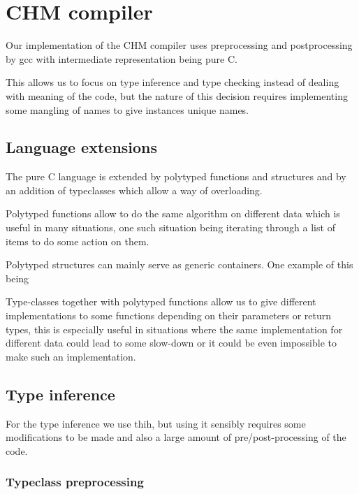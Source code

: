 \chapter{CHM compiler}

Our implementation of the CHM compiler uses preprocessing and postprocessing by gcc
with intermediate representation being pure C.

This allows us to focus on type inference and type checking instead of dealing with
meaning of the code, but the nature of this decision requires implementing some mangling
of names to give instances unique names.


\section{Language extensions}

The pure C language is extended by polytyped functions and structures and by
an addition of typeclasses which allow a way of overloading.

Polytyped functions allow to do the same algorithm on different data
which is useful in many situations, one such situation being iterating
through a list of items to do some action on them.

Polytyped structures can mainly serve as generic containers.
One example of this being %

Type-classes together with polytyped functions allow us to give different
implementations to some functions depending on their parameters or return
types, this is especially useful in situations where the same implementation
for different data could lead to some slow-down or it could be even
impossible to make such an implementation.



\section{Type inference}

For the type inference we use thih, %
but using it sensibly requires some modifications to be made and also a large
amount of pre/post-processing of the code.

\subsection{Typeclass preprocessing}

